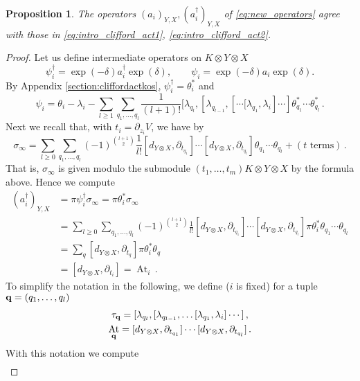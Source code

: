 \documentclass[english,letter paper,12pt,leqno]{article}
\newtheorem{proposition}[theorem]{Proposition}
\theoremstyle{example}
\numberwithin{equation}{section}
\DeclareMathOperator{\At}{At}
\begin{document}
\begin{proposition}\label{prop:clifford_action} The operators $(a_i)_{Y,X}, (a_i^{\dagger})_{Y,X}$ of \eqref{eq:new_operators} agree with those in \eqref{eq:intro_clifford_act1}, \eqref{eq:intro_clifford_act2}.
\end{proposition}
\begin{proof}
Let us define intermediate operators on $K \otimes Y \otimes X$
\[
\psi_i^\dagger = \exp(-\delta) a_i^\dagger \exp(\delta), \qquad \psi_i = \exp(-\delta) a_i \exp(\delta).
\]
By Appendix \ref{section:cliffordactkos}, $\psi_i^\dagger = \theta^*_i$ and
\[
\psi_i = \theta_i - \lambda_i - \sum_{l \ge 1} \sum_{q_1,\ldots,q_l} \frac{1}{(l+1)!} [ \lambda_{q_l}, [ \lambda_{q_{l-1}}, [ \cdots \big[ \lambda_{q_1}, \lambda_i ] \cdots ] \theta_{q_1}^* \cdots \theta_{q_l}^*\,.
\]
Next we recall that, with $t_i = \partial_{z_i} V$, we have by \cite[Section 10]{dm1102.2957}
\begin{equation}\label{eq:atiyah_formula_sigma}
\sigma_\infty = \sum_{l \ge 0} \sum_{q_1,\ldots,q_l} (-1)^{\binom{l+1}{2}} \frac{1}{l!} [ d_{Y \otimes X}, \partial_{t_{q_1}}] \cdots [ d_{Y \otimes X}, \partial_{t_{q_l}}] \theta_{q_1} \cdots \theta_{q_l} + (t \text{ terms})\,.
\end{equation}
That is, $\sigma_\infty$ is given modulo the submodule $(t_1,\ldots,t_m) K \otimes Y \otimes X$ by the formula above. Hence we compute
\begin{align*}
(a_i^\dagger)_{Y,X} &= \pi \psi_i^\dagger \sigma_\infty = \pi \theta_i^* \sigma_\infty\\
&= \sum_{l \ge 0} \sum_{q_1,\ldots,q_l} (-1)^{\binom{l+1}{2}} \frac{1}{l!} [ d_{Y \otimes X}, \partial_{t_{q_1}}] \cdots [ d_{Y \otimes X}, \partial_{t_{q_l}}] \pi \theta_i^* \theta_{q_1} \cdots \theta_{q_l}\\
&= \sum_q [d_{Y \otimes X}, \partial_{t_q}] \pi \theta_i^* \theta_q\\
&= [d_{Y \otimes X}, \partial_{t_i}] = \At_i\,.
\end{align*}
To simplify the notation in the following, we define ($i$ is fixed) for a tuple $\bold{q} = (q_1,\ldots,q_l)$
\begin{gather*}
\tau_{\bold{q}} = [ \lambda_{q_l}, [ \lambda_{q_{l-1}}, \ldots [ \lambda_{q_1}, \lambda_i ] \cdots ]\,,\\
\At_{\bold{q}} = [ d_{Y \otimes X}, \partial_{t_{q_1}}] \cdots [ d_{Y \otimes X}, \partial_{t_{q_l}}]\,.
\end{gather*}
With this notation we compute
\begin{align*}

\end{align*}
\end{proof}
\end{document}
